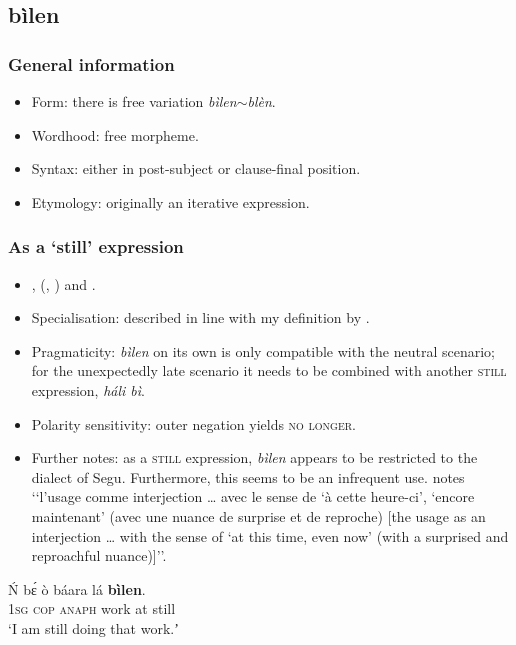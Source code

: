\subsection{bìlen}
\subsubsection{General information}
\begin{itemize}
	\item Form: there is free variation \textit{bìlen}$\sim$\textit{blèn}.
	\item Wordhood: free morpheme.
	\item Syntax: either in post-subject or clause-final position.
	\item Etymology: originally an iterative expression.
\end{itemize}


\subsubsection{As a  \lq still\rq{ }expression}
\label{exAppendixBambaraBilenStill}
\begin{itemize}
	\item \textcite[311]{Dumestre2003}, \citeauthor{DombrowskyHahn2020} (\citeyear{DombrowskyHahn2020}, \citeyear{DombrowskyHahn2021}) and \textcite[123]{Vydrine2015}.
	\item Specialisation: described in line with my definition by \textcite{DombrowskyHahn2021}.
	\item Pragmaticity: \textit{bìlen} on its own is only compatible with the neutral scenario; for the unexpectedly late scenario it needs to be combined with another \textsc{still} expression, \textit{háli bì}.
	\item Polarity sensitivity: outer negation yields \textsc{no longer}.
	\item Further notes: as a \textsc{still} expression, \textit{bìlen} appears to be restricted to the dialect of Segu. Furthermore, this seems to be an infrequent use. \textcite[311]{Dumestre2003} notes \lq\lq l'usage comme interjection … avec le sense de \lq à cette heure-ci', \lq encore maintenant' (avec une nuance de surprise et de reproche) [the usage as an interjection … with the sense of \lq at this time, even now' (with a surprised and reproachful nuance)]\rq\rq.
\end{itemize}

\begin{exe}
	\ex
	\gll Ń bɛ́ ò báara lá \textbf{bìlen}.\\
	1\textsc{sg} \textsc{cop} \textsc{anaph} work at still\\
	\glt \lq I am still doing that work.ʼ \parencite[120]{DombrowskyHahn2020}
\end{exe}

